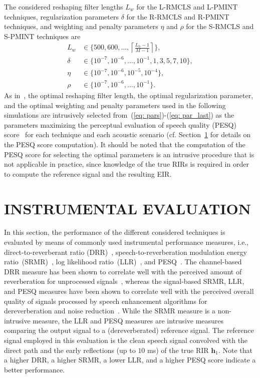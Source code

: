 \documentclass[fleqn]{aes2e}
\begin{document}
The considered reshaping filter lengths $L_w$ for the L-RMCLS and L-PMINT techniques, regularization parameters $\delta$ for the R-RMCLS and R-PMINT techniques, and weighting and penalty parameters $\eta$ and $\rho$ for the S-RMCLS and S-PMINT techniques are
\begin{align}
\label{eq: pars}
L_w & \in \{ 500, 600, \ldots, \left\lceil{\frac{L_h-1}{M-1}}\right\rceil \}, \\
\delta & \in \{10^{-7}, 10^{-6}, \ldots, 10^{-1}, 1, 3, 5, 7, 10 \}, \\
\eta & \in \{ 10^{-7}, 10^{-6}, 10^{-5}, 10^{-4}\}, \\
\label{eq: par_last}
\rho & \in \{ 10^{-7}, 10^{-6}, \ldots, 10^{-1} \}.
\end{align}
As in~\cite{Kodrasi_EUSIPCO_2012, Kodrasi_ITASLP_2013}, the optimal reshaping filter length, the optimal regularization parameter, and the optimal weighting and penalty parameters used in the following simulations are intrusively selected from~(\ref{eq: pars})-(\ref{eq: par_last}) as the parameters maximizing the perceptual evaluation of speech quality (PESQ) score~\cite{PESQ} for each technique and each acoustic scenario (cf. Section~\ref{sec: obj} for details on the PESQ score computation). 
It should be noted that the computation of the PESQ score for selecting the optimal parameters is an intrusive procedure that is not applicable in practice, since knowledge of the true RIRs is required in order to compute the reference signal and the resulting EIR.


\section{INSTRUMENTAL EVALUATION}
\label{sec: obj}
In this section, the performance of the different considered techniques is evaluated by means of commonly used instrumental performance measures, i.e., direct-to-reverberant ratio (DRR)~\cite{Naylor_Derev_book}, speech-to-reverberation modulation energy ratio~(SRMR)~\cite{Santos_IWAENC_2014}, log likelihood ratio~(LLR)~\cite{Hu_ITASLP_2008}, and PESQ~\cite{PESQ}.
The channel-based DRR measure has been shown to correlate well with the perceived amount of reverberation for unprocessed signals~\cite{Cauchi_ICASSP_2016}, whereas the signal-based SRMR, LLR, and PESQ measures have been shown to correlate well with the perceived overall quality of signals processed by speech enhancement algorithms for dereverberation and noise reduction~\cite{Kinoshita_EURASIP_2016}.
While the SRMR measure is a non-intrusive measure, the LLR and PESQ measures are intrusive measures comparing the output signal to a (dereverberated) reference signal.
The reference signal employed in this evaluation is the clean speech signal convolved with the direct path and the early reflections (up to $10$ ms) of the true RIR $\mathbf{h}_1$.
Note that a higher DRR, a higher SRMR, a lower LLR, and a higher PESQ score indicate a better performance.
\end{document}
